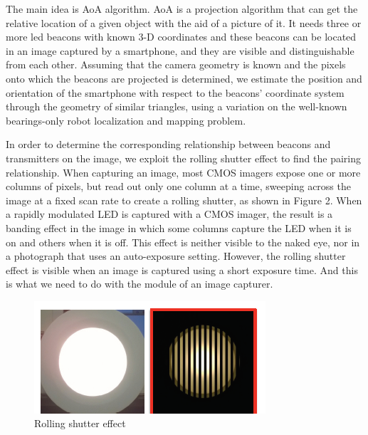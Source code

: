 \documentclass[a4paper, 11pt]{article} %
\begin{document}
The main idea is AoA algorithm. AoA is a projection algorithm that can get the relative location of a given object with the aid of a picture of it. It needs three or more led beacons with known 3-D coordinates and these beacons can be located in an image captured by a smartphone, and they are visible and distinguishable from each other. Assuming that the camera geometry is known and the pixels onto which the beacons are projected is determined, we estimate the position and orientation of the smartphone with respect to the beacons' coordinate system through the geometry of similar triangles, using a variation on the well-known bearings-only robot localization and mapping problem\cite{AoA}.

In order to determine the corresponding relationship between beacons and transmitters on the image, we exploit the rolling shutter effect to find the pairing relationship. When capturing an image, most CMOS imagers expose one or more columns of pixels, but read out only one column at a time, sweeping across the image at a fixed scan rate to create a rolling shutter, as shown in Figure 2. When a rapidly modulated LED is captured with a CMOS imager, the result is a banding effect in the image in which some columns capture the LED when it is on and others when it is off. This effect is neither visible to the naked eye, nor in a photograph that uses an auto-exposure setting. However, the rolling shutter effect is visible when an image is captured using a short exposure time. And this is what we need to do with the module of an image capturer.

\begin{figure}[h]
	\centering 
	\includegraphics[width=0.8\linewidth]{Figure2.png}
	\caption{Rolling shutter effect}
	\label{fig:subfig}
\end{figure}
\end{document}
